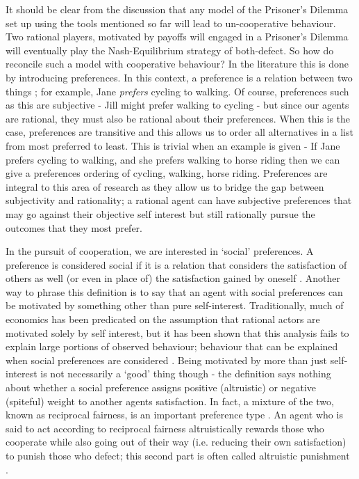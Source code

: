 \documentclass[11pt]{article}
\newcommand*{\np}{\par\noindent\newline}
\begin{document}
\np It should be clear from the discussion that any model of the Prisoner's Dilemma set up using the tools mentioned so far will lead to un-cooperative behaviour. Two rational players, motivated by payoffs will engaged in a Prisoner's Dilemma will eventually play the Nash-Equilibrium strategy of both-defect. So how do reconcile such a model with cooperative behaviour? In the literature this is done by introducing preferences. In this context, a preference is a relation between two things \citep{angner_course_2012}; for example, Jane \textit{prefers} cycling to walking. Of course, preferences such as this are subjective - Jill might prefer walking to cycling - but since our agents are rational, they must also be rational about their preferences. When this is the case, preferences are transitive and this allows us to order all alternatives in a list from most preferred to least. This is trivial when an example is given - If Jane prefers cycling to walking, and she prefers walking to horse riding then we can give a preferences ordering of cycling, walking, horse riding. Preferences are integral to this area of research as they allow us to bridge the gap between subjectivity and rationality; a rational agent can have subjective preferences that may go against their objective self interest but still rationally pursue the outcomes that they most prefer.

\np In the pursuit of cooperation, we are interested in `social' preferences. A preference is considered social if
it is a relation that considers the satisfaction of others as well (or even in place of) the satisfaction gained by
oneself \citep{angner_course_2012}. Another way to phrase this definition is to say that an agent with social
preferences can be motivated by something other than pure self-interest. Traditionally, much of economics has been
predicated on the assumption that rational actors are motivated solely by self interest, but it has been shown that this
analysis fails to explain large portions of observed behaviour; behaviour that can be explained when social preferences
are considered \citep{fehr_why_2002}. Being motivated by more than just self-interest is not necessarily a `good' thing
though - the definition says nothing about whether a social preference assigns positive (altruistic) or negative
(spiteful) weight to another agents satisfaction. In fact, a mixture of the two, known as reciprocal fairness, is an
important preference type \citep{fehr_why_2002,guth_evolutionary_1995}. An agent who is said to act according to
reciprocal fairness altruistically rewards those who cooperate while also going out of their way (i.e. reducing their own satisfaction) to punish those who defect; this second part is often called altruistic punishment 
\citep{fehr_altruistic_2002}.
\end{document}
